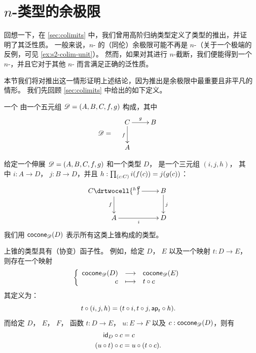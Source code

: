 %

\section{\texorpdfstring{$n$}{n}-类型的余极限}
\label{sec:pushouts}

回想一下，在 \cref{sec:colimits} 中，我们曾用高阶归纳类型定义了类型的推出，并证明了其泛性质。
一般来说，$n$-\type{} 的（同伦）余极限可能不再是 $n$-\type{}（关于一个极端的反例，可见 \cref{ex:s2-colim-unit}）。
然而，如果对其进行 $n$-截断，我们便能得到一个 $n$-\type{}，并且它对于其他 $n$-\type{} 而言满足正确的泛性质。

本节我们将对推出这一情形证明上述结论，因为推出是余极限中最重要且非平凡的情形。
我们先回顾 \cref{sec:colimits} 中给出的如下定义。

\begin{defn}
  一个 %
  由一个五元组 $\Ddiag=(A,B,C,f,g)$ 构成，其中 %
  \[\Ddiag=\quad\vcenter{\xymatrix{C \ar^g[r] \ar_f[d] & B \\ A & }}\]
\end{defn}

\begin{defn}
  给定一个伸展 $\Ddiag=(A,B,C,f,g)$ 和一个类型 $D$，%
   是一个三元组 $(i, j, h)$，
  其中 $i:A\to{}D$， $j:B\to{}D$，并且 $h : \prd{c:C}i(f(c))=j(g(c))$：
  \[\uppercurveobject{{ }}\lowercurveobject{{ }}\twocellhead{{ }}
  \xymatrix{C \ar^g[r] \ar_f[d] \drtwocell{^h} & B \ar^j[d] \\ A \ar_i[r] & D
  }\]
  我们用 $\cocone{\Ddiag}{D}$ 表示所有这类上锥构成的类型。
\end{defn}

上锥的类型具有（协变）函子性。
例如，给定 $D$， $E$%
以及一个映射 $t:D\to{}E$，则存在一个映射
  \[\function{\cocone{\Ddiag}{D}}{\cocone{\Ddiag}{E}}{c}{\composecocone{t}c}\]
  其定义为：
  \[\composecocone{t}(i,j,h)=(t\circ{}i,t\circ{}j,\mapfunc{t}\circ{}h).\]
而给定 $D$， $E$， $F$，%
函数 $t:D\to{}E$， $u:E\to{}F$ 以及 $c:\cocone{\Ddiag}{D}$，则有
\begin{align}
  \composecocone{\idfunc[D]}c &= c \label{eq:composeconeid}\\
  \composecocone{(u\circ{}t)}c&=\composecocone{u}(\composecocone{t}c). \label{eq:composeconefunc}
\end{align}

